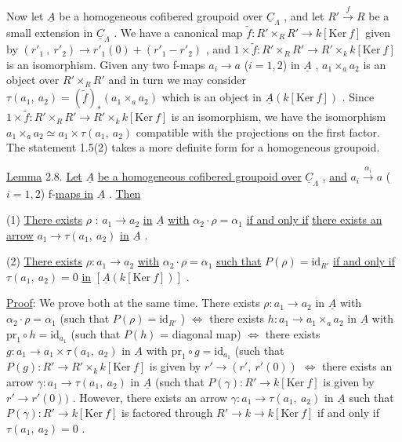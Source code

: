Now let  $\underline{A}$  be a homogeneous cofibered groupoid over  $\underline{C}_{\Lambda}$  , and let  $R' \xrightarrow{\ f\ } R$  be a small extension in  $\underline{C}_{\Lambda}$  . We have a canonical map
$\tilde{f} : R' \times_{R} R' \longrightarrow k[\mathrm{Ker}\ f]$  given by  $(r'_{1}\ ,\ r'_{2}) \longrightarrow r'_{1}(0) + (r'_{1} - r'_{2})$  , and  $1 \times \tilde{f} : R' \times_{R} R' \longrightarrow R' \times_{k} k[\mathrm{Ker}\ f]$  is an isomorphism. Given any two f-maps  $a_{i} \to a$  ($i=1,2$) in  $\underline{A}$  ,  $a_{1} \times_{a} a_{2}$  is an object over  $R' \times_{R} R'$  and in turn we may consider  $\tau(a_{1},\ a_{2}) = (\tilde{f})_{*}(a_{1} \times_{a} a_{2})$  which is an object in  $\underline{A}(k[\mathrm{Ker}\ f])$  . Since  $1 \times \tilde{f} : R' \times_{R} R' \longrightarrow R' \times_{k} k[\mathrm{Ker}\ f]$  is an isomorphism, we have the isomorphism  $a_{1} \times_{a} a_{2} \simeq a_{1} \times \tau(a_{1},\ a_{2})$  compatible with the projections on the first factor. The statement 1.5(2) takes a more definite form for a homogeneous groupoid.

\underline{Lemma} 2.8.  \underline{Let}  $\underline{A}$  \underline{be a homogeneous cofibered groupoid over}  $\underline{C}_{\Lambda}$  , \underline{and}  $a_{i} \xrightarrow{\ \alpha_{i}\ } a$  ($i = 1, 2$)  f-\underline{maps in}  $\underline{A}$  . \underline{Then}

(1)  \underline{There exists}  $\rho$  : $a_{1} \to a_{2}$  \underline{in}  $\underline{A}$  \underline{with}  $\alpha_{2} \cdot \rho = \alpha_{1}$  \underline{if and only if} \underline{there exists an arrow}  $a_{1} \to \tau(a_{1},\ a_{2})$  \underline{in}  $\underline{A}$  .

(2)  \underline{There exists}  $\rho : a_{1} \to a_{2}$  \underline{with}  $\alpha_{2} \cdot \rho = \alpha_{1}$  \underline{such that}  $P(\rho) = \mathrm{id}_{R'}$ \underline{if and only if}  $\tau(a_{1},\ a_{2}) = 0$  \underline{in}  $[\underline{A}(k[\mathrm{Ker}\ f])]$  .

\underline{Proof}:  We prove both at the same time. There exists  $\rho : a_{1} \to a_{2}$  in  $\underline{A}$  with  $\alpha_{2} \cdot \rho = \alpha_{1}$  (such that  $P(\rho) = \mathrm{id}_{R'}$ )  $\Leftrightarrow$  there exists  $h : a_{1} \to a_{1} \times_{a} a_{2}$  in  $\underline{A}$  with  $\mathrm{pr}_{1} \circ h = \mathrm{id}_{a_{1}}$  (such that  $P(h)$ = diagonal map)  $\Leftrightarrow$ there exists  $g : a_{1} \to a_{1} \times \tau(a_{1},\ a_{2})$  in  $\underline{A}$  with  $\mathrm{pr}_{1} \circ g = \mathrm{id}_{a_{1}}$  (such that  $P(g) : R' \to R' \times_{k} k[\mathrm{Ker}\ f]$  is given by  $r' \to (r',\ r'(0))$  $\Leftrightarrow$ there exists an arrow  $\gamma : a_{1} \to \tau(a_{1},\ a_{2})$  in  $\underline{A}$  (such that  $P(\gamma) : R' \to k[\mathrm{Ker}\ f]$  is given by  $r' \to r'(0))$  . However, there exists an arrow  $\gamma : a_{1} \to \tau(a_{1},\ a_{2})$  in  $\underline{A}$  such that  $P(\gamma) : R' \to k[\mathrm{Ker}\ f]$  is factored through  $R' \to k \to k[\mathrm{Ker}\ f]$  if and only if  $\tau(a_{1},\ a_{2}) = 0$  .

